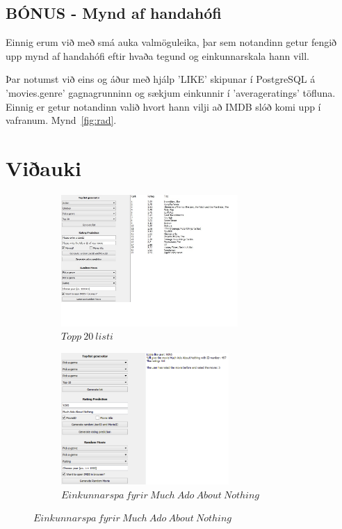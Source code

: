 \documentclass[11pt,a4paper]{amsart}
\theoremstyle{plain}
\theoremstyle{definition}
\theoremstyle{remark}
\begin{document}
\subsection{BÓNUS - Mynd af handahófi}
Einnig erum við með smá auka valmöguleika, þar sem notandinn getur fengið upp mynd af handahófi eftir hvaða tegund og einkunnarskala hann vill.\par Þar notumst við eins og áður með hjálp 'LIKE' skipunar í PostgreSQL á 'movies.genre' gagnagrunninn og sækjum einkunnir í 'averageratings' töfluna.  Einnig er getur notandinn valið hvort hann vilji að IMDB slóð komi upp í vafranum. Mynd~\ref{fig:rad}.

\newpage

\section{Viðauki}
\vspace{2mm}
\begin{figure}[H]
	\centering
	\begin{subfigure}[b]{0.5\textwidth}
		\includegraphics[height=50mm]{ui_top20.jpg}
		\caption{$ Topp\ 20\ listi $\label{fig:top20}}
	\end{subfigure}
	\begin{subfigure}[b]{0.4\textwidth}
		\includegraphics[height=50mm]{predict.png}
		\caption{$ Einkunnarspa\ fyrir\ Much\ Ado\ About\ Nothing$\label{fig:predict}}	
	\end{subfigure}
\end{figure}
\vspace{2mm}
\end{document}
